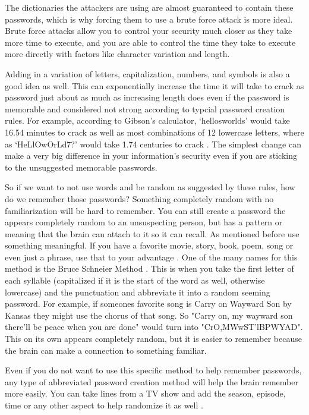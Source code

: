 \documentclass[acmsmall,nonacm]{acmart}
\begin{document}
\noindent The dictionaries the attackers are using are almost guaranteed to contain these passwords, which is why forcing them to use a brute force attack is more ideal. Brute force attacks allow you to control your security much closer as they take more time to execute, and you are able to control the time they take to execute more directly with factors like character variation and length.
  

Adding in a variation of letters, capitalization, numbers, and symbols is also a good idea as well. This can exponentially increase the time it will take to crack as password just about as much as increasing length does even if the password is memorable and considered not strong according to typcial password creation rules\cite{lee_2014}. For example, according to Gibson’s calculator, ‘hellosworlds’ would take 16.54 minutes to crack as well as most combinations of 12 lowercase letters, where as ‘HeLlOwOrLd7?’ would take 1.74 centuries to crack \cite{rubenking_2021}. The simplest change can make a very big difference in your information's security even if you are sticking to the unsuggested memorable passwords.


So if we want to not use words and be random as suggested by these rules, how do we remember those passwords? Something completely random with no familiarization will be hard to remember. You can still create a password the appears completely random to an unsuspecting person, but has a pattern or meaning that the brain can attach to it so it can recall. As mentioned before use something meaningful. If you have a favorite movie, story, book, poem, song or even just a phrase, use that to your advantage \cite{lee_2014,rubenking_2021}. One of the many names for this method is the Bruce Schneier Method \cite{lee_2014}. This is when you take the first letter of each syllable (capitalized if it is the start of the word as well, otherwise lowercase) and the punctuation and abbreviate it into a random seeming password. For example, if someones favorite song is Carry on Wayward Son by Kansas they might use the chorus of that song. So "Carry on, my wayward son there'll be peace when you are done" would turn into "CrO,MWwST'lBPWYAD". This on its own appears completely random, but it is easier to remember because the brain can make a connection to something familiar. 


Even if you do not want to use this specific method to help remember passwords, any type of abbreviated password creation method will help the brain remember more easily. You can take lines from a TV show and add the season, episode, time or any other aspect to help randomize it as well \cite{rubenking_2021}. 
\end{document}
